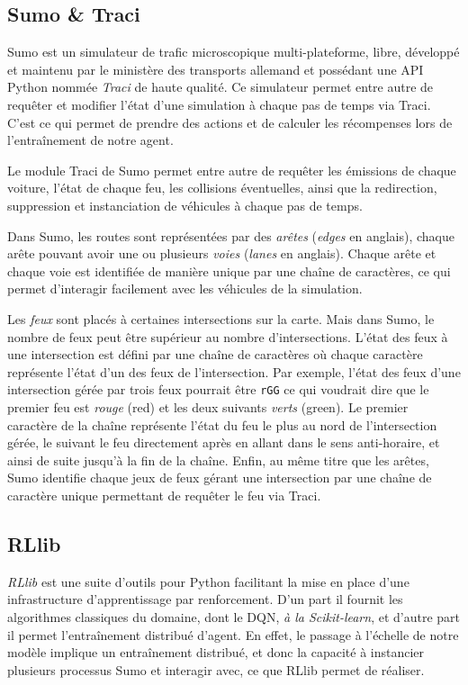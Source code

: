\documentclass[11pt]{article}
\begin{document}
\subsection{Sumo \& Traci}
\label{sec:org32d1cbd}

Sumo est un simulateur de trafic microscopique multi-plateforme, libre, développé et maintenu par le ministère des transports allemand et possédant une API Python nommée \emph{Traci} de haute qualité. Ce simulateur permet entre autre de requêter et modifier l'état d'une simulation à chaque pas de temps via Traci. C'est ce qui permet de prendre des actions et de calculer les récompenses lors de l'entraînement de notre agent.

Le module Traci de Sumo permet entre autre de requêter les émissions de chaque voiture, l'état de chaque feu, les collisions éventuelles, ainsi que la redirection, suppression et instanciation de véhicules à chaque pas de temps.

Dans Sumo, les routes sont représentées par des \emph{arêtes} (\emph{edges} en anglais), chaque arête pouvant avoir une ou plusieurs \emph{voies} (\emph{lanes} en anglais). Chaque arête et chaque voie est identifiée de manière unique par une chaîne de caractères, ce qui permet d'interagir facilement avec les véhicules de la simulation.

Les \emph{feux} sont placés à certaines intersections sur la carte. Mais dans Sumo, le nombre de feux peut être supérieur au nombre d'intersections. L'état des feux à une intersection est défini par une chaîne de caractères où chaque caractère représente l'état d'un des feux de l'intersection. Par exemple, l'état des feux d'une intersection gérée par trois feux pourrait être \texttt{rGG} ce qui voudrait dire que le premier feu est \emph{rouge} (red) et les deux suivants \emph{verts} (green). Le premier caractère de la chaîne représente l'état du feu le plus au nord de l'intersection gérée, le suivant le feu directement après en allant dans le sens anti-horaire, et ainsi de suite jusqu'à la fin de la chaîne. Enfin, au même titre que les arêtes, Sumo identifie chaque jeux de feux gérant une intersection par une chaîne de caractère unique permettant de requêter le feu via Traci.

\subsection{RLlib}
\label{sec:orgba7f9e3}

\emph{RLlib} est une suite d'outils pour Python facilitant la mise en place d'une infrastructure d'apprentissage par renforcement. D'un part il fournit les algorithmes classiques du domaine, dont le DQN, \emph{à la Scikit-learn}, et d'autre part il permet l'entraînement distribué d'agent. En effet, le passage à l'échelle de notre modèle implique un entraînement distribué, et donc la capacité à instancier plusieurs processus Sumo et interagir avec, ce que RLlib permet de réaliser.
\end{document}
